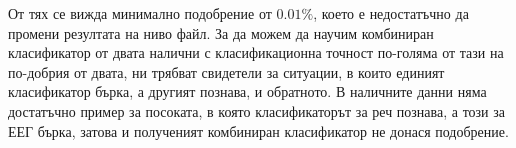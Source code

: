 \documentclass[main.tex]{subfiles}
\begin{document}
От тях се вижда минимално подобрение от $0.01\%$, което е недостатъчно да промени резултата на ниво файл. 
За да можем да научим комбиниран класификатор от двата налични с класификационна точност по-голяма от тази на по-добрия от двата, ни трябват свидетели за ситуации, в които единият класификатор бърка, а другият познава, и обратното. В наличните данни няма достатъчно пример за посоката, в която класификаторът за реч познава, а този за ЕЕГ бърка, затова и полученият комбиниран класификатор не донася подобрение. 
\end{document}

